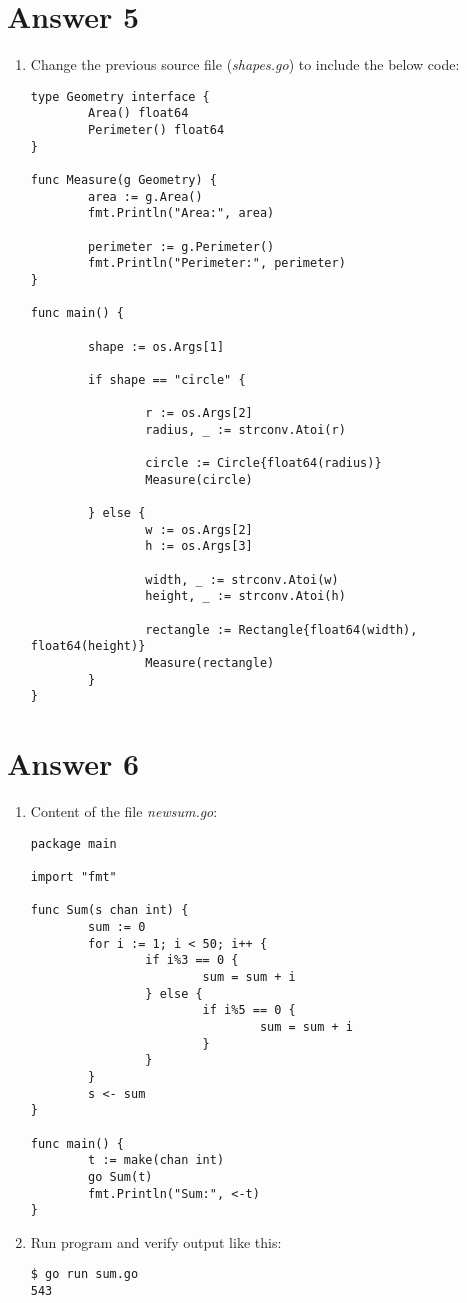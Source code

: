 \documentclass[11pt,a4paper]{article}
\begin{document}
\section*{Answer 5}
\begin{enumerate}
\item Change the previous source file ({\it shapes.go}) to include the below code:
\begin{verbatim}
type Geometry interface {
        Area() float64
        Perimeter() float64
}

func Measure(g Geometry) {
        area := g.Area()
        fmt.Println("Area:", area)

        perimeter := g.Perimeter()
        fmt.Println("Perimeter:", perimeter)
}

func main() {

        shape := os.Args[1]

        if shape == "circle" {

                r := os.Args[2]
                radius, _ := strconv.Atoi(r)

                circle := Circle{float64(radius)}
                Measure(circle)

        } else {
                w := os.Args[2]
                h := os.Args[3]

                width, _ := strconv.Atoi(w)
                height, _ := strconv.Atoi(h)

                rectangle := Rectangle{float64(width), float64(height)}
                Measure(rectangle)
        }
}
\end{verbatim}

\end{enumerate}


\section*{Answer 6}
\begin{enumerate}
\item Content of the file {\it newsum.go}:
\begin{verbatim}
package main

import "fmt"

func Sum(s chan int) {
        sum := 0
        for i := 1; i < 50; i++ {
                if i%3 == 0 {
                        sum = sum + i
                } else {
                        if i%5 == 0 {
                                sum = sum + i
                        }
                }
        }
        s <- sum
}

func main() {
        t := make(chan int)
        go Sum(t)
        fmt.Println("Sum:", <-t)
}
\end{verbatim}

\item Run program and verify output like this:
\begin{verbatim}
$ go run sum.go
543
\end{verbatim}

\end{enumerate}
\end{document}

